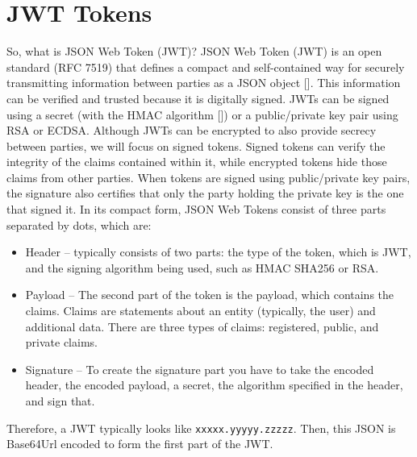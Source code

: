 \section{JWT Tokens}\label{sec:jwt-tokens}
So, what is JSON Web Token (JWT)?
JSON Web Token (JWT) is an open standard (RFC 7519) that defines a compact and self-contained way for securely
transmitting information between parties as a JSON object [\cite{jones2015json}].
This information can be verified and trusted because it is digitally signed.
JWTs can be signed using a secret (with the HMAC algorithm [\cite{wang2004hmac}]) or a public/private key pair using RSA or ECDSA\@.
Although JWTs can be encrypted to also provide secrecy between parties, we will focus on signed tokens.
Signed tokens can verify the integrity of the claims contained within it, while encrypted tokens hide those claims from
other parties.
When tokens are signed using public/private key pairs, the signature also certifies that only the party holding the
private key is the one that signed it.
In its compact form, JSON Web Tokens consist of three parts separated by dots, which are:
\begin{itemize}
    \item Header -- typically consists of two parts: the type of the token, which is JWT, and the signing algorithm
    being used, such as HMAC SHA256 or RSA\@.
    \item Payload -- The second part of the token is the payload, which contains the claims.
    Claims are statements about an entity (typically, the user) and additional data.
    There are three types of claims: registered, public, and private claims.
    \item Signature -- To create the signature part you have to take the encoded header, the encoded payload, a secret,
    the algorithm specified in the header, and sign that.
\end{itemize}
Therefore, a JWT typically looks like \texttt{xxxxx.yyyyy.zzzzz}.
Then, this JSON is Base64Url encoded to form the first part of the JWT\@.


